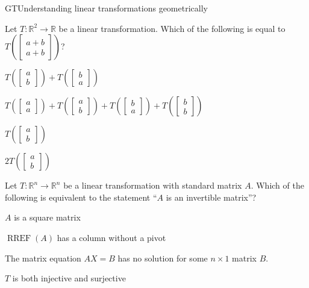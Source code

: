 \documentclass{article}
\newcommand{\IR}{\mathbb{R}}
\newcommand{\RREF}{\operatorname{RREF}}
\begin{document}
\begin{module}{GT}{Understanding linear transformations geometrically}
\begin{readinessAssuranceTest}
\item Let $T: \IR^2 \rightarrow \IR$ be a linear transformation.  Which of the following is equal to $T\left(\begin{bmatrix} a+b \\ a+b \end{bmatrix}\right)$?
\begin{multicols}{2}
\begin{readinessAssuranceTestChoices}
\item $T\left(\begin{bmatrix}a \\ b \end{bmatrix} \right)+T\left(\begin{bmatrix}b \\ a \end{bmatrix} \right)$%
\item $T\left(\begin{bmatrix} a \\ a \end{bmatrix}\right)+T\left(\begin{bmatrix}a \\ b \end{bmatrix} \right)+T\left(\begin{bmatrix}b \\ a \end{bmatrix}\right)+T\left(\begin{bmatrix}b \\ b \end{bmatrix} \right)$ 
\item $T\left(\begin{bmatrix}a \\ b \end{bmatrix} \right)$
\item $2T\left(\begin{bmatrix}a \\ b \end{bmatrix} \right)$
\end{readinessAssuranceTestChoices}
\end{multicols}

\item Let $T: \IR^n \rightarrow \IR^n$ be a linear transformation with standard matrix $A$.  Which of the following is equivalent to the statement ``$A$ is an invertible matrix''?
\begin{readinessAssuranceTestChoices}
\item $A$ is a square matrix
\item $\RREF(A)$ has a column without a pivot
\item The matrix equation $AX=B$ has no solution for some $n\times 1$
      matrix $B$.
\item $T$ is both injective and surjective %
\end{readinessAssuranceTestChoices}


\end{readinessAssuranceTest}
\end{module}
\end{document}
